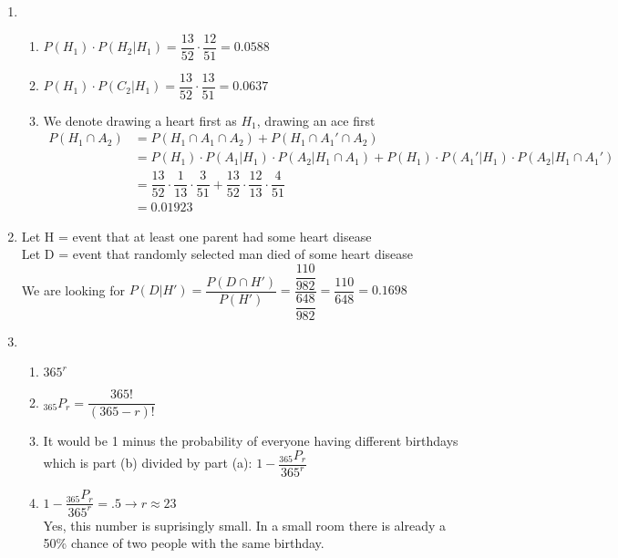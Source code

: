 \documentclass{article}
\newcommand\perm[2]{{}_{#1}P_{#2}}%
\begin{document}
\begin{enumerate}
	\item
	  \begin{enumerate}
	    \item $P(H_1) \cdot P(H_2 | H_1) = \dfrac{13}{52} \cdot \dfrac{12}{51} = 0.0588$
	    \item $P(H_1) \cdot P(C_2 | H_1) = \dfrac{13}{52} \cdot \dfrac{13}{51} = 0.0637$
	    \item We denote drawing a heart first as $H_1$, drawing an ace first 
	      \begin{align*}
		P(H_1 \cap A_2) &= P(H_1 \cap A_1 \cap A_2) + P(H_1 \cap A_1' \cap A_2) \\
		&= P(H_1)\cdot P(A_1|H_1)\cdot P(A_2|H_1 \cap A_1) 
		  + P(H_1)\cdot P(A_1'|H_1)\cdot P(A_2|H_1 \cap A_1') \\
		&= \dfrac{13}{52}\cdot\dfrac{1}{13}\cdot\dfrac{3}{51} 
		+ \dfrac{13}{52}\cdot\dfrac{12}{13}\cdot\dfrac{4}{51} \\
		&= 0.01923
	      \end{align*}
	  \end{enumerate}
	  \addtocounter{enumi}{1}
	  
	\item 
	  Let H = event that at least one parent had some heart disease \\
	  Let D = event that randomly selected man died of some heart disease \\
	  
	  We are looking for $P(D|H') = \dfrac{P(D \cap H')}{P(H')} 
	  = \dfrac{\dfrac{110}{982}}{\dfrac{648}{982}} = \dfrac{110}{648} = 0.1698$
	  \addtocounter{enumi}{4}
	  
	\item 
	  \begin{enumerate}
	   \item $365^r$
	   \item $\perm{365}{r} = \dfrac{365!}{(365-r)!}$
	   \item It would be 1 minus the probability of everyone having different birthdays which
	      is part (b) divided by part (a): $1 - \dfrac{\perm{365}{r}}{365^r}$
	   \item 
	      $1 - \dfrac{\perm{365}{r}}{365^r} = .5 \rightarrow r \approx 23$ \\
	      
	      Yes, this number is suprisingly small. In a small room there is already a 50\%
	      chance of two people with the same birthday.
	  \end{enumerate}
	  

\end{enumerate}
\end{document}
